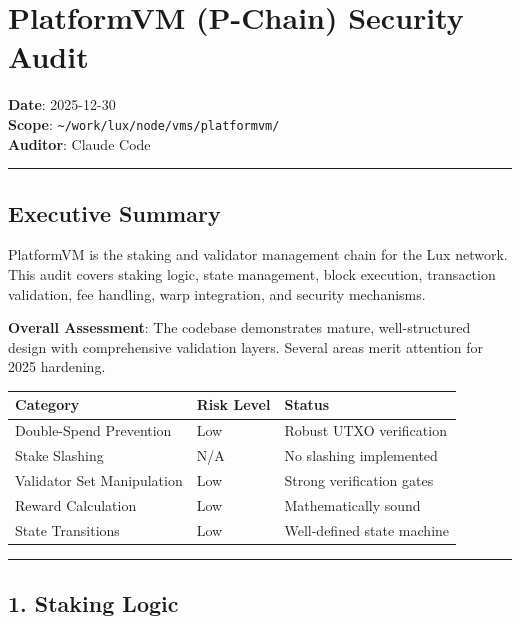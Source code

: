 \documentclass[
]{article}
\author{}
\date{}
\newcounter{none} %
\begin{document}
\section{PlatformVM (P-Chain) Security
Audit}\label{platformvm-p-chain-security-audit}

\textbf{Date}: 2025-12-30\\
\textbf{Scope}:
\texttt{\textasciitilde{}/work/lux/node/vms/platformvm/}\\
\textbf{Auditor}: Claude Code

\begin{center}\rule{0.5\linewidth}{0.5pt}\end{center}

\subsection{Executive Summary}\label{executive-summary}

PlatformVM is the staking and validator management chain for the Lux
network. This audit covers staking logic, state management, block
execution, transaction validation, fee handling, warp integration, and
security mechanisms.

\textbf{Overall Assessment}: The codebase demonstrates mature,
well-structured design with comprehensive validation layers. Several
areas merit attention for 2025 hardening.

{\def\LTcaptype{none} %
\begin{longtable}[]{@{}lll@{}}
\toprule\noalign{}
Category & Risk Level & Status \\
\midrule\noalign{}
\endhead
\bottomrule\noalign{}
\endlastfoot
Double-Spend Prevention & Low & Robust UTXO verification \\
Stake Slashing & N/A & No slashing implemented \\
Validator Set Manipulation & Low & Strong verification gates \\
Reward Calculation & Low & Mathematically sound \\
State Transitions & Low & Well-defined state machine \\
\end{longtable}
}

\begin{center}\rule{0.5\linewidth}{0.5pt}\end{center}

\subsection{1. Staking Logic}\label{1-staking-logic}
\end{document}

